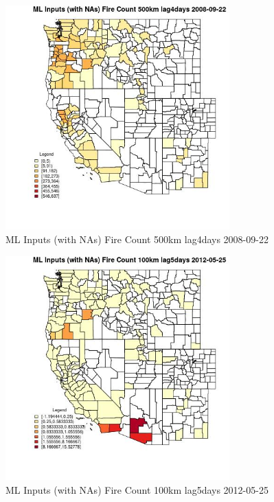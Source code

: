 \begin{figure} 
\centering  
\includegraphics[width=0.77\textwidth]{Code_Outputs/Report_ML_input_PM25_Step4_part_e_de_duplicated_aves_compiled_2019-05-18wNAs_CountyFire_Count_500km_lag4daysMean2008-09-22.jpg} 
\caption{\label{fig:Report_ML_input_PM25_Step4_part_e_de_duplicated_aves_compiled_2019-05-18wNAsCountyFire_Count_500km_lag4daysMean2008-09-22}ML Inputs (with NAs) Fire Count 500km lag4days 2008-09-22} 
\end{figure} 
 

\begin{figure} 
\centering  
\includegraphics[width=0.77\textwidth]{Code_Outputs/Report_ML_input_PM25_Step4_part_e_de_duplicated_aves_compiled_2019-05-18wNAs_CountyFire_Count_100km_lag5daysMean2012-05-25.jpg} 
\caption{\label{fig:Report_ML_input_PM25_Step4_part_e_de_duplicated_aves_compiled_2019-05-18wNAsCountyFire_Count_100km_lag5daysMean2012-05-25}ML Inputs (with NAs) Fire Count 100km lag5days 2012-05-25} 
\end{figure} 
 

